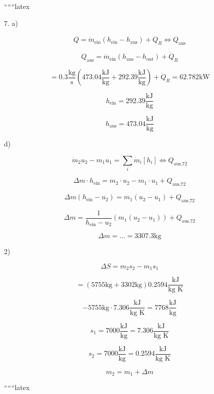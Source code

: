 
``````latex


7. a)

\[
Q = \dot{m}_{\text{ein}} (h_{\text{ein}} - h_{\text{aus}}) + \dot{Q}_R \iff Q_{\text{aus}}
\]

\[
Q_{\text{aus}} = \dot{m}_{\text{ein}} (h_{\text{aus}} - h_{\text{out}}) + \dot{Q}_R
\]

\[
= 0.3 \frac{\text{kg}}{\text{s}} (473.04 \frac{\text{kJ}}{\text{kg}} + 292.39 \frac{\text{kJ}}{\text{kg}}) + \dot{Q}_R = 62.782 \text{kW}
\]

\[
h_{\text{ein}} = 292.39 \frac{\text{kJ}}{\text{kg}}
\]

\[
h_{\text{aus}} = 473.04 \frac{\text{kJ}}{\text{kg}}
\]

d)

\[
\dot{m}_2 u_2 - m_1 u_1 = \sum_i \dot{m}_i [h_i] \iff Q_{\text{aus,72}}
\]

\[
\Delta m \cdot h_{\text{ein}} = m_2 \cdot u_2 - m_1 \cdot u_1 + Q_{\text{aus,72}}
\]

\[
\Delta m (h_{\text{ein}} - u_2) = m_1 (u_2 - u_1) + Q_{\text{aus,72}}
\]

\[
\Delta m = \frac{1}{h_{\text{ein}} - u_2} (m_1 (u_2 - u_1)) + Q_{\text{aus,72}}
\]

\[
\Delta m = \dots = 3307.3 \text{kg}
\]

2)

\[
\Delta S = m_2 s_2 - m_1 s_1
\]

\[
= (5755 \text{kg} + 3302 \text{kg}) 0.2594 \frac{\text{kJ}}{\text{kg K}}
\]

\[
- 5755 \text{kg} \cdot 7.306 \frac{\text{kJ}}{\text{kg K}} = 7768 \frac{\text{kJ}}{\text{kg}}
\]

\[
s_1 = 7000 \frac{\text{kJ}}{\text{kg}} = 7.306 \frac{\text{kJ}}{\text{kg K}}
\]

\[
s_2 = 7000 \frac{\text{kJ}}{\text{kg}} = 0.2594 \frac{\text{kJ}}{\text{kg K}}
\]

\[
m_2 = m_1 + \Delta m
\]

``````latex


